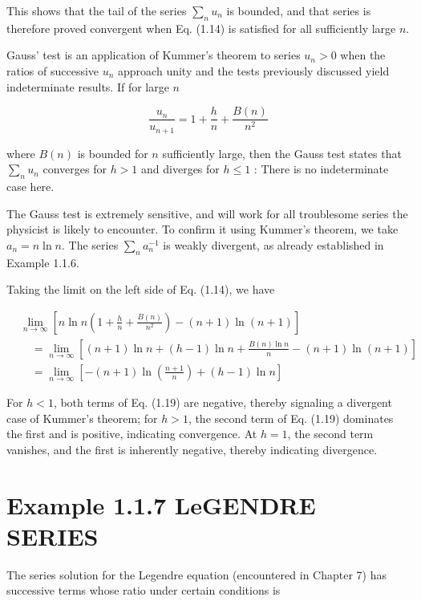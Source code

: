 \documentclass[10pt]{article}
\begin{document}
This shows that the tail of the series $\sum_{n} u_{n}$ is bounded, and that series is therefore proved convergent when Eq. (1.14) is satisfied for all sufficiently large $n$.

Gauss' test is an application of Kummer's theorem to series $u_{n}>0$ when the ratios of successive $u_{n}$ approach unity and the tests previously discussed yield indeterminate results. If for large $n$


\begin{equation*}
\frac{u_{n}}{u_{n+1}}=1+\frac{h}{n}+\frac{B(n)}{n^{2}} \tag{1.18}
\end{equation*}


where $B(n)$ is bounded for $n$ sufficiently large, then the Gauss test states that $\sum_{n} u_{n}$ converges for $h>1$ and diverges for $h \leq 1$ : There is no indeterminate case here.

The Gauss test is extremely sensitive, and will work for all troublesome series the physicist is likely to encounter. To confirm it using Kummer's theorem, we take $a_{n}=n \ln n$. The series $\sum_{n} a_{n}^{-1}$ is weakly divergent, as already established in Example 1.1.6.

Taking the limit on the left side of Eq. (1.14), we have


\begin{align*}
& \lim _{n \rightarrow \infty}\left[n \ln n\left(1+\frac{h}{n}+\frac{B(n)}{n^{2}}\right)-(n+1) \ln (n+1)\right] \\
& \quad=\lim _{n \rightarrow \infty}\left[(n+1) \ln n+(h-1) \ln n+\frac{B(n) \ln n}{n}-(n+1) \ln (n+1)\right] \\
& \quad=\lim _{n \rightarrow \infty}\left[-(n+1) \ln \left(\frac{n+1}{n}\right)+(h-1) \ln n\right] \tag{1.19}
\end{align*}


For $h<1$, both terms of Eq. (1.19) are negative, thereby signaling a divergent case of Kummer's theorem; for $h>1$, the second term of Eq. (1.19) dominates the first and is positive, indicating convergence. At $h=1$, the second term vanishes, and the first is inherently negative, thereby indicating divergence.

\section*{Example 1.1.7 LeGENDRE SERIES}
The series solution for the Legendre equation (encountered in Chapter 7) has successive terms whose ratio under certain conditions is
\end{document}

